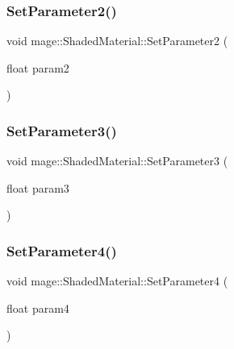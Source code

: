 \hypertarget{structmage_1_1_shaded_material_a2b32f69b11604f20bf63653eed0f93b0}{}\label{structmage_1_1_shaded_material_a2b32f69b11604f20bf63653eed0f93b0} 
\subsubsection{\texorpdfstring{Set\+Parameter2()}{SetParameter2()}}
{\footnotesize\ttfamily void mage\+::\+Shaded\+Material\+::\+Set\+Parameter2 (\begin{DoxyParamCaption}\item[{float}]{param2 }\end{DoxyParamCaption})\hspace{0.3cm}{\ttfamily [noexcept]}}

\hypertarget{structmage_1_1_shaded_material_aa03eb95e8375fa28c05a837c7e5195b5}{}\label{structmage_1_1_shaded_material_aa03eb95e8375fa28c05a837c7e5195b5} 
\subsubsection{\texorpdfstring{Set\+Parameter3()}{SetParameter3()}}
{\footnotesize\ttfamily void mage\+::\+Shaded\+Material\+::\+Set\+Parameter3 (\begin{DoxyParamCaption}\item[{float}]{param3 }\end{DoxyParamCaption})\hspace{0.3cm}{\ttfamily [noexcept]}}

\hypertarget{structmage_1_1_shaded_material_ac96ba1f979b75f973f3500f4cbd7e683}{}\label{structmage_1_1_shaded_material_ac96ba1f979b75f973f3500f4cbd7e683} 
\subsubsection{\texorpdfstring{Set\+Parameter4()}{SetParameter4()}}
{\footnotesize\ttfamily void mage\+::\+Shaded\+Material\+::\+Set\+Parameter4 (\begin{DoxyParamCaption}\item[{float}]{param4 }\end{DoxyParamCaption})\hspace{0.3cm}{\ttfamily [noexcept]}}

